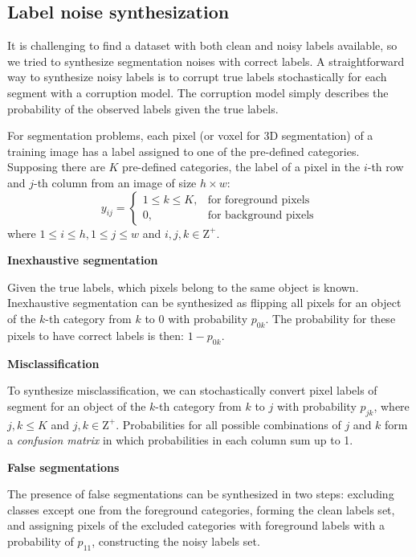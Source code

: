 \subsection{Label noise synthesization}
\label{subsec:noises}

It is challenging to find a dataset with both clean and noisy labels available, so we tried to synthesize segmentation noises with correct labels.
A straightforward way to synthesize noisy labels is to corrupt true labels stochastically for each segment with a corruption model.
The corruption model simply describes the probability of the observed labels given the true labels.

For segmentation problems, each pixel (or voxel for 3D segmentation) of a training image has a label assigned to one of the pre-defined categories.
Supposing there are $K$ pre-defined categories, the label of a pixel in the $i$-th row and $j$-th column from an image of size $h \times w$:
\[
  y_{ij} =
    \begin{cases}
      1 \leq k \leq K, & \text{for foreground pixels} \\
      0, & \text{for background pixels}
    \end{cases}
\]
where $1 \leq i \leq h, 1 \leq j \leq w$ and $i,j,k \in \mathrm{Z}^+$.


\textbf{Inexhaustive segmentation}

Given the true labels, which pixels belong to the same object is known.
Inexhaustive segmentation can be synthesized as flipping all pixels for an object of the $k$-th category from $k$ to $0$ with probability $p_{0k}$.
The probability for these pixels to have correct labels is then: $1-p_{0k}$.


\textbf{Misclassification}

To synthesize misclassification, we can stochastically convert pixel labels of segment for an object of the $k$-th category from $k$ to $j$ with probability $p_{jk}$, where $j, k \leq K$ and $j,k \in \mathrm{Z}^+$.
Probabilities for all possible combinations of $j$ and $k$ form a \textit{confusion matrix} in which probabilities in each column sum up to 1.

\textbf{False segmentations}

The presence of false segmentations can be synthesized in two steps: excluding classes except one from the foreground categories, forming the clean labels set, and assigning pixels of the excluded categories with foreground labels with a probability of $p_{11}$, constructing the noisy labels set.%
